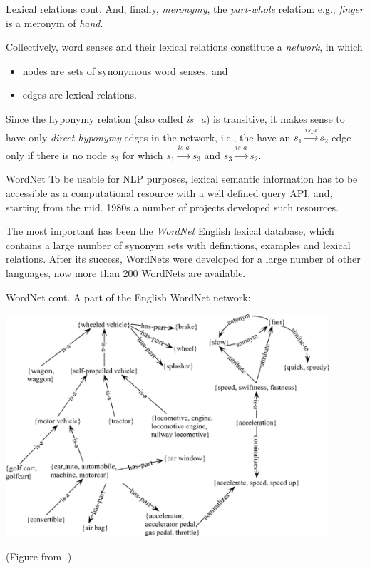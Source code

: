 \documentclass[style=upen, size=14pt]{powerdot}
\newcommand{\gold}{\color{arany}}
\theoremstyle{definition}
\begin{document}
\begin{slide}[toc=]{Lexical relations cont.}
  And, finally, \emph{\gold meronymy}, the \emph{part-whole} relation: e.g.,
  \emph{finger} is a meronym of \emph{hand}.\bigskip

  Collectively, word senses and their lexical relations constitute a \emph{\gold
    network}, in which
  \begin{itemize}
  \item nodes are sets of synonymous word senses, and
  \item edges are lexical relations. 
  \end{itemize}
  Since the hyponymy relation (also called \textit{is\_a}) is transitive, it
  makes sense to have only \emph{direct hyponymy} edges in the network, i.e.,
  the have an $s_1 \xrightarrow{is\_a} s_2$ edge only if there is no node $s_3$ for which
  $s_1 \xrightarrow{is\_a} s_3$ and $s_3 \xrightarrow{is\_a} s_2$.
\end{slide}

\begin{slide}[toc=WordNet]{WordNet}
  To be usable for NLP purposes, lexical semantic information has to be
  accessible as a computational resource with a well defined query API, and,
  starting from the mid. 1980s a number of projects developed such
  resources.\bigskip
  
  The most important has been the
  \href{https://wordnet.princeton.edu/}{\emph{WordNet}} English lexical
  database, which contains a large number of synonym sets with definitions,
  examples and lexical relations. After its success, WordNets were developed for
  a large number of other languages, now more than 200 WordNets are available.
\end{slide}

\begin{slide}[toc=]{WordNet cont.}
  A part of the English WordNet network:\medskip
  
  \begin{centering}
    
    \includegraphics[width=0.9\textwidth]{figures/wn.eps}


    \footnotesize{(Figure from \cite{navigli2009word}.)}
    
  \end{centering}
\end{slide}
\end{document}
